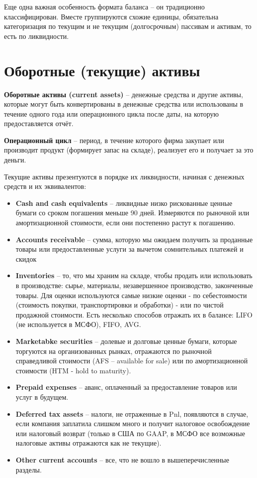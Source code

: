\documentclass{article}
\begin{document}
Еще одна важная особенность формата баланса – он традиционно классифицирован. Вместе группируются схожие единицы, обязательна категоризация по текущим и не текущим (долгосрочным) пассивам и активам, то есть по ликвидности.

\section{Оборотные (текущие) активы}

\textbf{Оборотные активы (current assets) }– денежные средства и другие активы, которые могут быть конвертированы в денежные средства или использованы в течение одного года или операционного цикла после даты, на которую предоставляется отчёт.

\textbf{Операционный цикл }– период, в течение которого фирма закупает или производит продукт (формирует запас на складе), реализует его и получает за это деньги. 

Текущие активы презентуются в порядке их ликвидности, начиная с денежных средств и их эквивалентов:

\begin{itemize}
\item \textbf{Cash and cash equivalents }– ликвидные низко рискованные ценные бумаги со сроком погашения меньше 90 дней. Измеряются по рыночной или амортизационной стоимости, если они постепенно растут к погашению.
\item \textbf{Accounts receivable }– сумма, которую мы ожидаем получить за проданные товары или предоставленные услуги за вычетом сомнительных платежей и скидок 
\item \textbf{Inventories} – то, что мы храним на складе, чтобы продать или использовать в производстве: сырье, материалы, незавершенное производство, законченные товары. Для оценки используются самые низкие оценки - по себестоимости (стоимость покупки, транспортировки и обработки) - или по чистой продажной стоимости. Есть несколько способов отражать их в балансе: LIFO (не используется в МСФО), FIFO, AVG.
\item \textbf{Marketabke securities} – долевые и долговые ценные бумаги, которые торгуются на организованных рынках, отражаются по рыночной справедливой стоимости (AFS – available for sale) или по амортизационной стоимости (HTM -  hold to maturity).
\item \textbf{Prepaid expenses} – аванс, оплаченный за предоставление товаров или услуг в будущем.
\item \textbf{Deferred tax assets} – налоги, не отраженные в Pnl, появляются в случае, если компания заплатила слишком много и получит налоговое освобождение или налоговый возврат (только в США по GAAP, в МСФО все возможные налоговые активы отражаются как не текущие).
\item \textbf{Other current accounts }– все, что не вошло в вышеперечисленные разделы.
\end{itemize}
\end{document}
